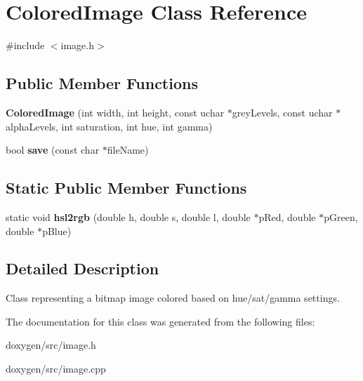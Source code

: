 \hypertarget{class_colored_image}{}\section{Colored\+Image Class Reference}
\label{class_colored_image}


{\ttfamily \#include $<$image.\+h$>$}

\subsection*{Public Member Functions}
\begin{DoxyCompactItemize}
\item 
\mbox{\label{class_colored_image_a4318459b9a275f2f6ff75ce76def2f95}} 
{\bfseries Colored\+Image} (int width, int height, const uchar $\ast$grey\+Levels, const uchar $\ast$alpha\+Levels, int saturation, int hue, int gamma)
\item 
\mbox{\label{class_colored_image_a8b614204b1a682c84ab32aecbb3bf542}} 
bool {\bfseries save} (const char $\ast$file\+Name)
\end{DoxyCompactItemize}
\subsection*{Static Public Member Functions}
\begin{DoxyCompactItemize}
\item 
\mbox{\label{class_colored_image_aa28cffecb75cf52b6b457178851704c5}} 
static void {\bfseries hsl2rgb} (double h, double s, double l, double $\ast$p\+Red, double $\ast$p\+Green, double $\ast$p\+Blue)
\end{DoxyCompactItemize}


\subsection{Detailed Description}
Class representing a bitmap image colored based on hue/sat/gamma settings. 

The documentation for this class was generated from the following files\+:\begin{DoxyCompactItemize}
\item 
doxygen/src/image.\+h\item 
doxygen/src/image.\+cpp\end{DoxyCompactItemize}
